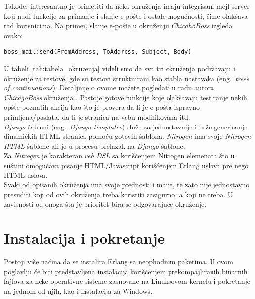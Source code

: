 \documentclass[a4paper]{article}
\begin{document}
{Takođe, interesantno je primetiti da neka okruženja imaju integrisani mejl server koji nudi funkcije za primanje i slanje e-pošte i ostale mogućnosti, čime olakšava rad korisnicima. Na primer, slanje e-pošte u okruženju {\em ChicahoBoss} izgleda ovako:

\begin{verbatim}
boss_mail:send(FromAddress, ToAddress, Subject, Body)
\end{verbatim} 

U tabeli \ref{tab:tabela_okruzenja} videli smo da sva tri okruženja podržavaju i okruženje za testove, gde su testovi struktuirani kao stabla nastavaka (eng.~{\em trees of continuations}). Detaljnije o ovome možete pogledati u radu autora {\em ChicagoBoss} okruženja \cite{EvanMillerTesting}. Postoje gotove funkcije koje olakšavaju testiranje nekih opšte poznatih akcija kao što je provera da li je e-pošta ispravno primljena/poslata, da li je stranica na vebu modifikovana itd. \\

{\em Django} šabloni (eng.~{\em Django templates}) \cite{DjangoTempDoc} služe za jednostavnije i brže generisanje dinamičkih HTML stranica pomoću gotovih šablona. {\em Nitrogen} ima svoje {\em Nitrogen HTML} šablone ali je u procesu prelazak na {\em Django} šablone. \\

Za {\em Nitrogen} \cite{NitrogenDocumentation} je karakteran {\em veb DSL} \cite{WebDSL} sa korišćenjem Nitrogen elemenata \cite{NitrogenDocumentation} što u suštini omogućava pisanje HTML/Javascript korišćenjem Erlang uslova pre nego HTML uslova. \\

Svaki od opisanih okruženja ima svoje prednosti i mane, te zato nije jednostavno presuditi koji od ovih okruženja treba koristiti zasigurno, a koji ne treba. U zavisnosti od onoga šta je prioritet bira se odgovarajuće okruženje.

\section{Instalacija i pokretanje}
\label{sec:instalacija}

Postoji više načina da se instalira Erlang sa neophodnim paketima.
U ovom poglavlju će biti predstavljena instalacija korišćenjem prekompajliranih binarnih fajlova 
za neke operativne sisteme zasnovane na Linuksovom kernelu i pokretanje na jednom od njih, kao i instalacija za Windows.

}
\end{document}
